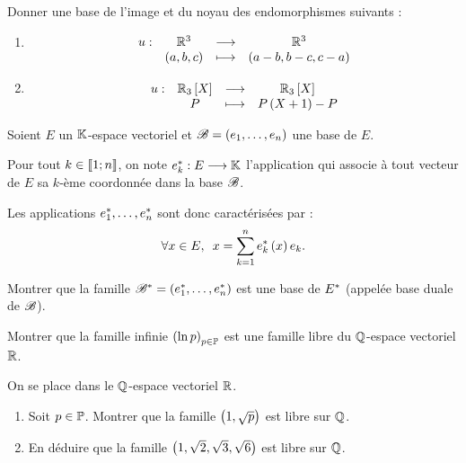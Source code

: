 \begin{corr}
\end{corr}

\begin{exo}
Donner une base de l'image et du noyau des endomorphismes suivants :

\begin{enumerate}
\item \[\begin{array}[t]{cccc}u : & \mathbb{R}^3 & \longrightarrow & \mathbb{R}^3 \\ & \left(a,b,c\right) & \longmapsto & \left(a-b,b-c,c-a\right)\end{array}\]

\item \[\fonction{u}{\polydeg[\R]{3}}{\polydeg[\R]{3}}{P}{P\paren{X+1}-P}\]
\end{enumerate}
\end{exo}

\begin{corr}
\end{corr}

\begin{exo}
Soient \(E\) un \(\mathbb{K}\)-espace vectoriel et \(\mathscr{B}=\left(e_1,\dots,e_n\right)\) une base de \(E\).

Pour tout \(k\in\left\llbracket1;n\right\rrbracket\), on note \(e_k^{*}:E\longrightarrow\mathbb{K}\) l'application qui associe à tout vecteur de \(E\) sa \(k\)-ème coordonnée dans la base \(\mathscr{B}\).

Les applications \(e_1^{*},\dots,e_n^{*}\) sont donc caractérisées par : \[\quantifs{\forall x\in E}x=\sum_{k=1}^ne_k\etoile\paren{x}e_k.\]

Montrer que la famille \(\mathscr{B}^{*}=\left(e_1^{*},\dots,e_n^{*}\right)\) est une base de \(E^{*}\) (appelée base duale de \(\mathscr{B}\)).
\end{exo}

\begin{corr}
\end{corr}

\begin{exo}
Montrer que la famille infinie \(\left(\ln p\right)_{p\in\mathbb{P}}\) est une famille libre du \(\mathbb{Q}\)-espace vectoriel \(\mathbb{R}\).
\end{exo}

\begin{corr}
\end{corr}

\begin{exo}
On se place dans le \(\mathbb{Q}\)-espace vectoriel \(\mathbb{R}\).

\begin{enumerate}
\item Soit \(p\in\mathbb{P}\). Montrer que la famille \(\left(1,\sqrt{p}\right)\) est libre sur \(\mathbb{Q}\). \\

\item En déduire que la famille \(\left(1,\sqrt{2},\sqrt{3},\sqrt{6}\right)\) est libre sur \(\mathbb{Q}\).
\end{enumerate}
\end{exo}

